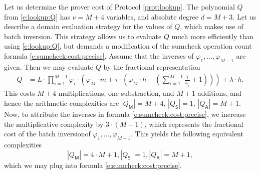 \documentclass[11pt]{article}
\theoremstyle{definition}
\theoremstyle{definition}
\begin{document}
Let us determine the prover cost of Protocol \ref{prot:lookup}.
The polynomial $Q$ from \eqref{e:lookup:Q} has $\nu= M + 4$ variables, and absolute degree $d = M + 3$.
Let us describe a domain evaluation strategy for the values of $Q$, which makes use of batch inversion. 
This strategy allows us to evaluate $Q$ much more efficiently than using \eqref{e:lookup:Q}, but demands a modification of the sumcheck operation count formula \eqref{e:sumcheck:cost:precise}.
Assume that the inverses of $\varphi_1, \ldots, \varphi_{M-1}$ are given.
Then we may evaluate $Q$ by the fractional representation
\begin{align*}
Q &= L\cdot  \prod_{i=1}^{M-1}\varphi_i\cdot \left(\varphi_M\cdot m + \tau\cdot \left(\varphi_M\cdot h - \left(\sum_{i=1}^{M-1} \frac{1}{\varphi_i} +1 \right)\right) \right) + \lambda\cdot h.
\end{align*}
This costs  $M + 4$ multiplications, one substraction, and $M+1$ additions, and hence
the arithmetic complexities are $|Q_\mathsf M| =  M +  4$, $|Q_\mathsf S| = 1$, $|Q_\mathsf A| = M + 1$.
Now, to attribute the inverses in formula \eqref{e:sumcheck:cost:precise}, we increase the multiplicative complexity by $3\cdot (M - 1)$, which represents the fractional cost of the batch inversion\footnotemark of $\varphi_1, \ldots, \varphi_{M-1}$. 
%
This yields the following equivalent complexities
 \[
|Q_\mathsf M| = 4\cdot M + 1 , |Q_\mathsf S| = 1, |Q_\mathsf A| = M + 1,
\]
which we may plug into formula \eqref{e:sumcheck:cost:precise}.
\end{document}
